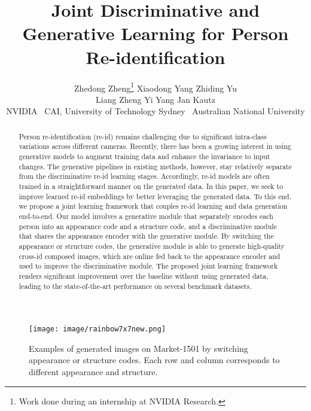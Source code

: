 \documentclass[10pt,twocolumn,letterpaper]{article}
\begin{document}
\title{Joint Discriminative and Generative Learning for Person Re-identification}

\author{
  Zhedong Zheng\thanks{Work done during an internship at NVIDIA Research.} \quad Xiaodong Yang \quad Zhiding Yu\\
  Liang Zheng \quad Yi Yang \quad Jan Kautz  \\ 
  NVIDIA ~CAI, University of Technology Sydney ~Australian National University\\
}

\maketitle


\begin{abstract}
Person re-identification (re-id) remains challenging due to significant intra-class variations across different cameras. Recently, there has been a growing interest in using generative models to augment training data and enhance the invariance to input changes. The generative pipelines in existing methods, however, stay relatively separate from the discriminative re-id learning stages. Accordingly, re-id models are often trained in a straightforward manner on the generated data. In this paper, we seek to improve learned re-id embeddings by better leveraging the generated data. To this end, we propose a joint learning framework that couples re-id learning and data generation end-to-end. Our model involves a generative module that separately encodes each person into an appearance code and a structure code, and a discriminative module that shares the appearance encoder with the generative module. By switching the appearance or structure codes, the generative module is able to generate high-quality cross-id composed images, which are online fed back to the appearance encoder and used to improve the discriminative module. The proposed joint learning framework renders significant improvement over the baseline without using generated data, leading to the state-of-the-art performance on several benchmark datasets.
\end{abstract}

\begin{figure}[t]
\begin{center}
\texttt{[image: image/rainbow7x7new.png]}
\end{center}\vspace{-.2in}
\caption{Examples of generated images on Market-1501 by switching appearance or structure codes. Each row and column corresponds to different appearance and structure.}
\label{fig:rainbow}
\end{figure}
\end{document}
